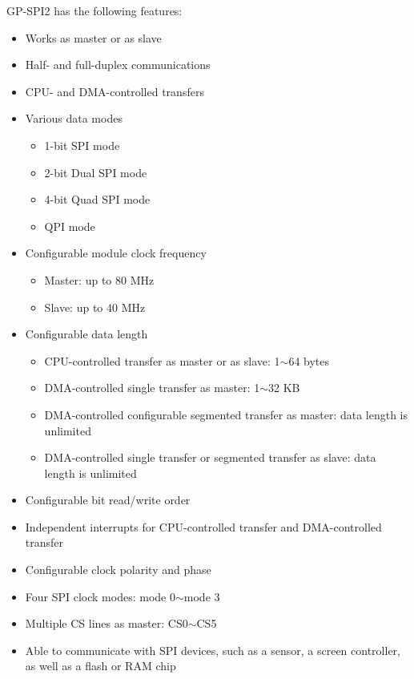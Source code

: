 \documentclass[main\_\_EN.tex]{subfiles}
\begin{document}
GP-SPI2 has the following features:
\begin{itemize}
    \item Works as master or as slave
    \item Half- and full-duplex communications
    \item CPU- and DMA-controlled transfers
    \item Various data modes
        \begin{itemize}
            \item 1-bit SPI mode
            \item 2-bit Dual SPI mode
            \item 4-bit Quad SPI mode
            \item QPI mode
        \end{itemize}
    \item Configurable module clock frequency
        \begin{itemize}
            \item Master: up to 80 MHz
            \item Slave: up to 40 MHz
        \end{itemize}
    \item Configurable data length
    \begin{itemize}
        \item CPU-controlled transfer as master or as slave: 1$\sim$64 bytes 
        \item DMA-controlled single transfer as master: 1$\sim$32 KB
        \item DMA-controlled configurable segmented transfer as master: data length is unlimited
        \item DMA-controlled single transfer or segmented transfer as slave: data length is unlimited
    \end{itemize}
    \item Configurable bit read/write order
    \item Independent interrupts for CPU-controlled transfer and DMA-controlled transfer
    \item Configurable clock polarity and phase
    \item Four SPI clock modes: mode 0$\sim$mode 3
    \item Multiple CS lines as master: CS0$\sim$CS5
    \item Able to communicate with SPI devices, such as a sensor, a screen controller, as well as a flash or RAM chip
\end{itemize}
\end{document}
